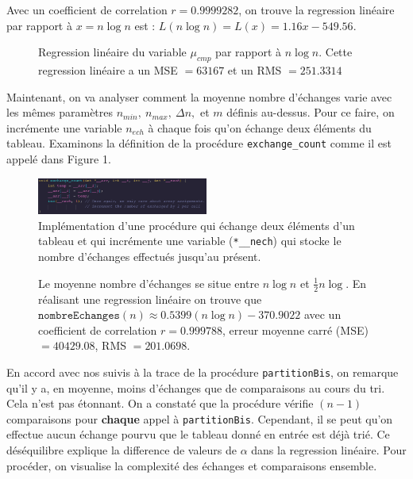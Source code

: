 \documentclass[10pt]{article} %
\begin{document}
Avec un coefficient de correlation $r = 0.9999282$, on trouve la regression linéaire par
rapport à $x = n\log n$ est : $L(n\log n) = L(x) = 1.16 x - 549.56$.

\newpage

\begin{figure}[h!]
    \centering
    
    \vspace{-1cm}
    \caption{Regression linéaire du variable $\mu_{cmp}$ par rapport à $n\log n$. Cette regression linéaire a un MSE $= 63167$ et un RMS $= 251.3314$}
\end{figure}

Maintenant, on va analyser comment la moyenne nombre d'échanges varie avec les mêmes paramètres
$n_{min},\ n_{max},\ \Delta n,$ et $m$ définis au-dessus. Pour ce faire, on incrémente une variable
$n_{ech}$ à chaque fois qu'on échange deux éléments du tableau. Examinons la définition de la procédure
\texttt{exchange\_count} comme il est appelé dans Figure 1.

\begin{figure}[h!]
    \centering
    \includegraphics[width=0.5\textwidth]{media/exchange_count.png}
    \caption{Implémentation d'une procédure qui échange deux éléments d'un tableau et qui incrémente une variable (\texttt{*\_\_nech}) qui stocke le nombre d'échanges effectués
    jusqu'au présent.}
\end{figure}


\begin{figure}[h!]
    \centering
    
    \vspace{-1cm}
    \caption{Le moyenne nombre d'échanges se situe entre $n \log n$ et $\frac{1}{2}n \log $. En réalisant une regression linéaire on trouve que
    $\texttt{nombreEchanges}(n) \approx 0.5399(n \log n) - 370.9022$ avec un coefficient de correlation $r = 0.999788$, erreur moyenne carré (MSE) $= 40429.08$, RMS $= 201.0698$.}
\end{figure}

En accord avec nos suivis à la trace de la procédure \texttt{partitionBis}, on remarque qu'il y a, en moyenne, moins d'échanges que de comparaisons au cours du tri. Cela n'est pas étonnant.
On a constaté que la procédure vérifie $(n - 1)$ comparaisons pour \textbf{chaque} appel à \texttt{partitionBis}. Cependant, il se peut qu'on effectue aucun échange pourvu que le tableau donné
en entrée est déjà trié. Ce déséquilibre explique la difference de valeurs de $\alpha$ dans la regression linéaire.
\pagestyle{plain}
Pour procéder, on visualise la complexité des échanges et comparaisons ensemble.
\end{document}
